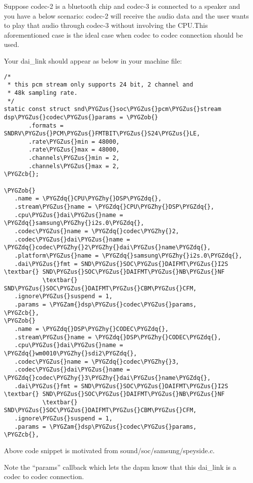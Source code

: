 \documentclass[a4paper,8pt,english]{sphinxmanual}
\def\PYGZus{\char`\_}
\def\PYGZob{\char`\{}
\def\PYGZcb{\char`\}}
\def\PYGZam{\char`\&}
\def\PYGZhy{\char`\-}
\def\PYGZdq{\char`\"}
\begin{document}
Suppose codec-2 is a bluetooth chip and codec-3 is connected to
a speaker and you have a below scenario:
codec-2 will receive the audio data and the user wants to play that
audio through codec-3 without involving the CPU.This
aforementioned case is the ideal case when codec to codec
connection should be used.

Your dai\_link should appear as below in your machine
file:

\begin{Verbatim}[commandchars=\\\{\}]
/*
 * this pcm stream only supports 24 bit, 2 channel and
 * 48k sampling rate.
 */
static const struct snd\PYGZus{}soc\PYGZus{}pcm\PYGZus{}stream dsp\PYGZus{}codec\PYGZus{}params = \PYGZob{}
       .formats = SNDRV\PYGZus{}PCM\PYGZus{}FMTBIT\PYGZus{}S24\PYGZus{}LE,
       .rate\PYGZus{}min = 48000,
       .rate\PYGZus{}max = 48000,
       .channels\PYGZus{}min = 2,
       .channels\PYGZus{}max = 2,
\PYGZcb{};

\PYGZob{}
   .name = \PYGZdq{}CPU\PYGZhy{}DSP\PYGZdq{},
   .stream\PYGZus{}name = \PYGZdq{}CPU\PYGZhy{}DSP\PYGZdq{},
   .cpu\PYGZus{}dai\PYGZus{}name = \PYGZdq{}samsung\PYGZhy{}i2s.0\PYGZdq{},
   .codec\PYGZus{}name = \PYGZdq{}codec\PYGZhy{}2,
   .codec\PYGZus{}dai\PYGZus{}name = \PYGZdq{}codec\PYGZhy{}2\PYGZhy{}dai\PYGZus{}name\PYGZdq{},
   .platform\PYGZus{}name = \PYGZdq{}samsung\PYGZhy{}i2s.0\PYGZdq{},
   .dai\PYGZus{}fmt = SND\PYGZus{}SOC\PYGZus{}DAIFMT\PYGZus{}I2S \textbar{} SND\PYGZus{}SOC\PYGZus{}DAIFMT\PYGZus{}NB\PYGZus{}NF
           \textbar{} SND\PYGZus{}SOC\PYGZus{}DAIFMT\PYGZus{}CBM\PYGZus{}CFM,
   .ignore\PYGZus{}suspend = 1,
   .params = \PYGZam{}dsp\PYGZus{}codec\PYGZus{}params,
\PYGZcb{},
\PYGZob{}
   .name = \PYGZdq{}DSP\PYGZhy{}CODEC\PYGZdq{},
   .stream\PYGZus{}name = \PYGZdq{}DSP\PYGZhy{}CODEC\PYGZdq{},
   .cpu\PYGZus{}dai\PYGZus{}name = \PYGZdq{}wm0010\PYGZhy{}sdi2\PYGZdq{},
   .codec\PYGZus{}name = \PYGZdq{}codec\PYGZhy{}3,
   .codec\PYGZus{}dai\PYGZus{}name = \PYGZdq{}codec\PYGZhy{}3\PYGZhy{}dai\PYGZus{}name\PYGZdq{},
   .dai\PYGZus{}fmt = SND\PYGZus{}SOC\PYGZus{}DAIFMT\PYGZus{}I2S \textbar{} SND\PYGZus{}SOC\PYGZus{}DAIFMT\PYGZus{}NB\PYGZus{}NF
           \textbar{} SND\PYGZus{}SOC\PYGZus{}DAIFMT\PYGZus{}CBM\PYGZus{}CFM,
   .ignore\PYGZus{}suspend = 1,
   .params = \PYGZam{}dsp\PYGZus{}codec\PYGZus{}params,
\PYGZcb{},
\end{Verbatim}

Above code snippet is motivated from sound/soc/samsung/speyside.c.

Note the ``params'' callback which lets the dapm know that this
dai\_link is a codec to codec connection.
\end{document}
